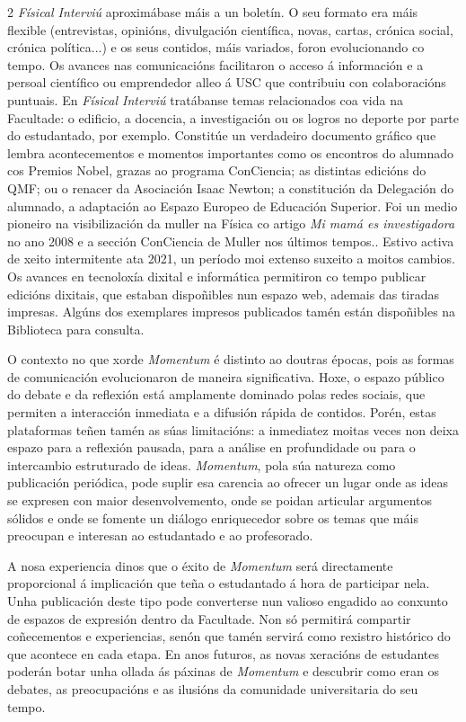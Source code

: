 \begin{multicols}{2}
\textit{Físical Interviú} aproximábase máis a un boletín. O seu formato era máis
flexible (entrevistas, opinións, divulgación científica, novas, cartas, crónica
social, crónica política...) e os seus contidos, máis variados, foron
evolucionando co tempo. Os avances nas comunicacións facilitaron o acceso á
información e a persoal científico ou emprendedor alleo á USC que contribuiu
con colaboracións puntuais. En \textit{Físical Interviú} tratábanse temas relacionados
coa vida na Facultade: o edificio, a docencia, a investigación ou os logros no
deporte por parte do estudantado, por exemplo. Constitúe un verdadeiro
documento gráfico que lembra acontecementos e momentos  importantes como os
encontros do alumnado cos Premios Nobel, grazas ao programa ConCiencia; as
distintas edicións do QMF; ou o renacer da Asociación Isaac Newton; a
constitución da Delegación do alumnado, a adaptación ao Espazo Europeo de
Educación Superior. Foi un medio pioneiro na visibilización da muller na Física
co artigo \textit{Mi mamá es investigadora} no ano 2008 e a sección ConCiencia de Muller
nos últimos tempos.. Estivo activa de xeito intermitente ata 2021, un período
moi extenso suxeito a moitos cambios. Os avances en tecnoloxía dixital e
informática permitiron co tempo publicar edicións dixitais, que estaban
dispoñibles nun espazo web, ademais das tiradas impresas. Algúns dos exemplares
impresos  publicados tamén están dispoñibles na Biblioteca para consulta.

O contexto no que xorde \textit{Momentum} é distinto ao doutras épocas, pois as formas
de comunicación evolucionaron de maneira significativa. Hoxe, o espazo público
do debate e da reflexión está amplamente dominado polas redes sociais, que
permiten a interacción inmediata e a difusión rápida de contidos. Porén, estas
plataformas teñen tamén as súas limitacións: a inmediatez moitas veces non
deixa espazo para a reflexión pausada, para a análise en profundidade ou para o
intercambio estruturado de ideas. \textit{Momentum}, pola súa natureza como publicación
periódica, pode suplir esa carencia ao ofrecer un lugar onde as ideas se
expresen con maior desenvolvemento, onde se poidan articular argumentos sólidos
e onde se fomente un diálogo enriquecedor sobre os temas que máis preocupan e
interesan ao estudantado e ao profesorado.

A nosa experiencia dinos que o éxito de \textit{Momentum} será directamente proporcional
á implicación que teña o estudantado á hora de participar nela. Unha
publicación deste tipo pode converterse nun valioso engadido ao conxunto de
espazos de expresión dentro da Facultade. Non só permitirá compartir
coñecementos e experiencias, senón que tamén servirá como rexistro histórico do
que acontece en cada etapa. En anos futuros, as novas xeracións de estudantes
poderán botar unha ollada ás páxinas de \textit{Momentum} e descubrir como eran os
debates, as preocupacións e as ilusións da comunidade universitaria do seu
tempo.


\end{multicols}
